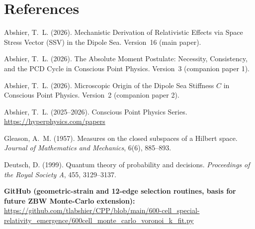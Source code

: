 \documentclass[12pt]{article}
\begin{document}
\section*{References}

\begin{enumerate}[label={[\arabic*]}]
  \item Abshier, T.~L. (2026).
    Mechanistic Derivation of Relativistic Effects via Space Stress Vector
    (SSV) in the Dipole Sea.  Version~16 (main paper).

  \item Abshier, T.~L. (2026).
    The Absolute Moment Postulate: Necessity, Consistency, and the PCD Cycle
    in Conscious Point Physics.  Version~3 (companion paper 1).

  \item Abshier, T.~L. (2026).
    Microscopic Origin of the Dipole Sea Stiffness $C$ in Conscious Point
    Physics.  Version~2 (companion paper 2).

  \item Abshier, T.~L. (2025--2026).
    Conscious Point Physics Series.
    \url{https://hyperphysics.com/papers}

  \item Gleason, A.~M. (1957).
    Measures on the closed subspaces of a Hilbert space.
    \textit{Journal of Mathematics and Mechanics}, 6(6), 885--893.

  \item Deutsch, D. (1999).
    Quantum theory of probability and decisions.
    \textit{Proceedings of the Royal Society A}, 455, 3129--3137.
\end{enumerate}

\bigskip
\noindent\textbf{GitHub (geometric-strain and 12-edge selection routines,
basis for future ZBW Monte-Carlo extension):}\\
\url{https://github.com/tlabshier/CPP/blob/main/600-cell_special-relativity_emergence/600cell_monte_carlo_voronoi_k_fit.py}
\end{document}

